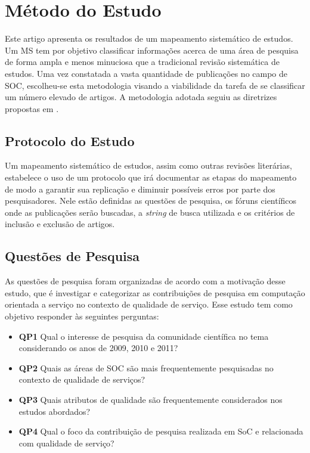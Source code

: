 
\section{Método do Estudo}\label{sec:review_method}

Este artigo apresenta os resultados de um mapeamento sistemático de estudos. Um MS tem por objetivo classificar informações acerca de uma área de pesquisa de forma ampla e menos minuciosa que a tradicional revisão sistemática de estudos. Uma vez constatada a vasta quantidade de publicações no campo de SOC, escolheu-se esta metodologia visando a viabilidade da tarefa de se classificar um número elevado de artigos. A metodologia adotada seguiu as diretrizes propostas em \cite{Petersen:2008:SMS:2227115.2227123}.

\subsection{Protocolo do Estudo}

Um mapeamento sistemático de estudos, assim como outras revisões literárias, estabelece o uso de um protocolo que irá documentar as etapas do mapeamento de modo a garantir sua replicação e diminuir possíveis erros por parte dos pesquisadores. Nele estão definidas as questões de pesquisa, os fóruns científicos onde as publicações serão buscadas, a \textit{string} de busca utilizada e os critérios de inclusão e exclusão de artigos. 

\subsection{Quest\~{o}es de Pesquisa}

As questões de pesquisa foram organizadas de acordo com a motivação desse estudo, que é investigar e categorizar as contribuições de pesquisa em computação orientada a serviço no contexto de qualidade de serviço. Esse estudo tem como objetivo responder às seguintes perguntas: 

\begin{itemize}
\item {\bf QP1} Qual o interesse de pesquisa da comunidade científica no tema considerando os anos de 2009, 2010 e 2011? 
\item {\bf QP2} Quais as áreas de SOC são mais frequentemente pesquisadas no contexto de qualidade de serviços?
\item {\bf QP3} Quais atributos de qualidade são frequentemente considerados nos estudos abordados?
\item {\bf QP4} Qual o foco da contribuição de pesquisa realizada em SoC e relacionada com qualidade de serviço?   
\end{itemize}


